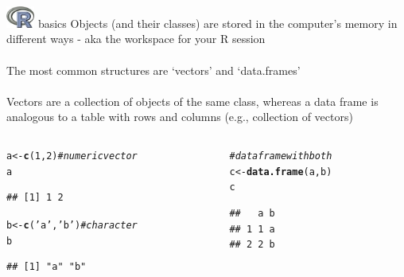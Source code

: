 \documentclass[xcolor=svgnames]{beamer}\usepackage[]{graphicx}\usepackage[]{color}
\makeatletter
\newcommand{\hlnum}[1]{\textcolor[rgb]{0.686,0.059,0.569}{#1}}%
\newcommand{\hlstr}[1]{\textcolor[rgb]{0.192,0.494,0.8}{#1}}%
\newcommand{\hlcom}[1]{\textcolor[rgb]{0.678,0.584,0.686}{\textit{#1}}}%
\newcommand{\hlstd}[1]{\textcolor[rgb]{0.345,0.345,0.345}{#1}}%
\newcommand{\hlkwb}[1]{\textcolor[rgb]{0.69,0.353,0.396}{#1}}%
\newcommand{\hlkwd}[1]{\textcolor[rgb]{0.737,0.353,0.396}{\textbf{#1}}}%
\newenvironment{kframe}{%
 \def\at@end@of@kframe{}%
 \ifinner\ifhmode%
  \def\at@end@of@kframe{\end{minipage}}%
  \begin{minipage}{\columnwidth}%
 \fi\fi%
 \def\FrameCommand##1{\hskip\@totalleftmargin \hskip-\fboxsep
 \colorbox{shadecolor}{##1}\hskip-\fboxsep
     \hskip-\linewidth \hskip-\@totalleftmargin \hskip\columnwidth}%
 \MakeFramed {\advance\hsize-\width
   \@totalleftmargin\z@ \linewidth\hsize
   \@setminipage}}%
 {\par\unskip\endMakeFramed%
 \at@end@of@kframe}
\newenvironment{knitrout}{}{} %
\makeatother
\begin{document}
\begin{frame}[fragile]{\includegraphics[width=0.07\textwidth]{Rlogo.jpg} \hspace{0.01in} basics}
Objects (and their classes) are stored in the computer's memory in different ways - aka the workspace for your R session\\~\\
The most common structures are `vectors' and `data.frames'\\~\\
Vectors are a collection of objects of the same class, whereas a data frame is analogous to a table with rows and columns (e.g., collection of vectors)
\vspace{-0.2in}
\begin{columns}[t]
\begin{column}{0.5\textwidth}
\begin{knitrout}\scriptsize
{}\color{fgcolor}\begin{kframe}
\begin{alltt}
\hlstd{a} \hlkwb{<-} \hlkwd{c}\hlstd{(}\hlnum{1}\hlstd{,}\hlnum{2}\hlstd{)} \hlcom{# numeric vector}
\hlstd{a}
\end{alltt}
\begin{verbatim}
## [1] 1 2
\end{verbatim}
\begin{alltt}
\hlstd{b} \hlkwb{<-} \hlkwd{c}\hlstd{(}\hlstr{'a'}\hlstd{,} \hlstr{'b'}\hlstd{)} \hlcom{# character}
\hlstd{b}
\end{alltt}
\begin{verbatim}
## [1] "a" "b"
\end{verbatim}
\end{kframe}
\end{knitrout}
\end{column}
\begin{column}{0.5\textwidth}
\begin{knitrout}\scriptsize
{}\color{fgcolor}\begin{kframe}
\begin{alltt}
\hlcom{# data frame with both}
\hlstd{c} \hlkwb{<-} \hlkwd{data.frame}\hlstd{(a,b)}
\hlstd{c}
\end{alltt}
\begin{verbatim}
##   a b
## 1 1 a
## 2 2 b
\end{verbatim}
\end{kframe}
\end{knitrout}
\end{column}
\end{columns}
\end{frame}
\end{document}
